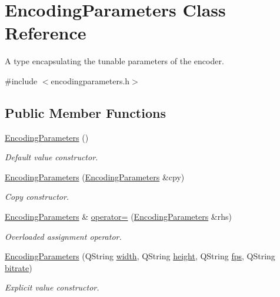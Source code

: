 \hypertarget{classEncodingParameters}{\section{Encoding\-Parameters Class Reference}
\label{classEncodingParameters}
}


A type encapsulating the tunable parameters of the encoder.  




{\ttfamily \#include $<$encodingparameters.\-h$>$}

\subsection*{Public Member Functions}
\begin{DoxyCompactItemize}
\item 
\hyperlink{classEncodingParameters_a4a588b84a8470dd246ad21c13e1c7c52}{Encoding\-Parameters} ()
\begin{DoxyCompactList}\small\item\em Default value constructor. \end{DoxyCompactList}\item 
\hyperlink{classEncodingParameters_a7e6b691f010a04b9cc2808a370df4f3b}{Encoding\-Parameters} (\hyperlink{classEncodingParameters}{Encoding\-Parameters} \&cpy)
\begin{DoxyCompactList}\small\item\em Copy constructor. \end{DoxyCompactList}\item 
\hyperlink{classEncodingParameters}{Encoding\-Parameters} \& \hyperlink{classEncodingParameters_a122c1cfb7456b687ae79e38244f7c5d0}{operator=} (\hyperlink{classEncodingParameters}{Encoding\-Parameters} \&rhs)
\begin{DoxyCompactList}\small\item\em Overloaded assignment operator. \end{DoxyCompactList}\item 
\hyperlink{classEncodingParameters_a1a17c69e916dd0fc2322e9264129e12c}{Encoding\-Parameters} (Q\-String \hyperlink{classEncodingParameters_ad784bc5e0a14e537f1bef3340a5a816f}{width}, Q\-String \hyperlink{classEncodingParameters_a65eeab477e176c521ad2aab0e46606b6}{height}, Q\-String \hyperlink{classEncodingParameters_aaae058a54aa6b2381047170d199a5131}{fps}, Q\-String \hyperlink{classEncodingParameters_a62e5d236efaa9594bd8706d9b6e79ba3}{bitrate})
\begin{DoxyCompactList}\small\item\em Explicit value constructor. \end{DoxyCompactList}\item 

\end{DoxyCompactItemize}
